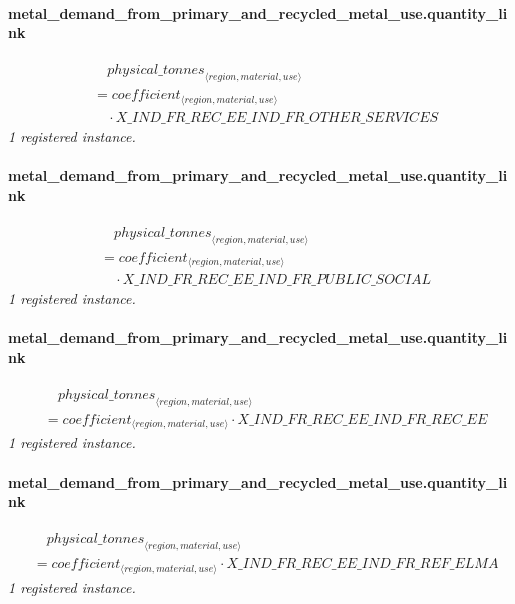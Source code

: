 \documentclass[11pt]{article}
\begin{document}
\paragraph{metal\_demand\_from\_primary\_and\_recycled\_metal\_use.quantity\_link}
\begin{align*}
&\quad {physical\_tonnes}_{\langle region, material, use\rangle}\\
&= coefficient_{\langle region, material, use\rangle}\\
&\quad {}\cdot X\_IND\_FR\_REC\_EE\_IND\_FR\_OTHER\_SERVICES
\end{align*}
\noindent\emph{1 registered instance.}\par
\paragraph{metal\_demand\_from\_primary\_and\_recycled\_metal\_use.quantity\_link}
\begin{align*}
&\quad {physical\_tonnes}_{\langle region, material, use\rangle}\\
&= coefficient_{\langle region, material, use\rangle}\\
&\quad {}\cdot X\_IND\_FR\_REC\_EE\_IND\_FR\_PUBLIC\_SOCIAL
\end{align*}
\noindent\emph{1 registered instance.}\par
\paragraph{metal\_demand\_from\_primary\_and\_recycled\_metal\_use.quantity\_link}
\begin{align*}
&\quad {physical\_tonnes}_{\langle region, material, use\rangle}\\
&= coefficient_{\langle region, material, use\rangle} \cdot X\_IND\_FR\_REC\_EE\_IND\_FR\_REC\_EE
\end{align*}
\noindent\emph{1 registered instance.}\par
\paragraph{metal\_demand\_from\_primary\_and\_recycled\_metal\_use.quantity\_link}
\begin{align*}
&\quad {physical\_tonnes}_{\langle region, material, use\rangle}\\
&= coefficient_{\langle region, material, use\rangle} \cdot X\_IND\_FR\_REC\_EE\_IND\_FR\_REF\_ELMA
\end{align*}
\noindent\emph{1 registered instance.}\par
\end{document}
